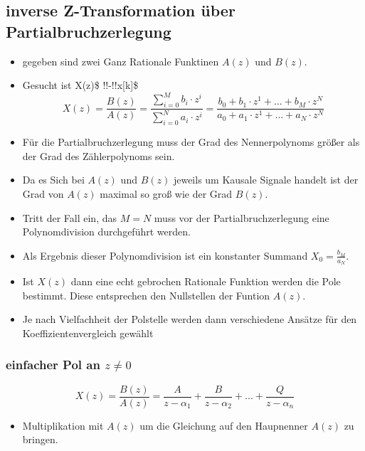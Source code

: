 \documentclass[11pt]{article}
\providecommand{\tightlist}{%
      \setlength{\itemsep}{0pt}\setlength{\parskip}{0pt}}
\begin{document}
    \subsection{inverse Z-Transformation über
Partialbruchzerlegung}\label{inverse-z-transformation-uxfcber-partialbruchzerlegung}

\begin{itemize}
\item
  gegeben sind zwei Ganz Rationale Funktinen \(A(z)\) und \(B(z)\).
\item
  Gesucht ist X(z)\$ \bullet !!-!!\circ x{[}k{]}\$
  \[X(z) = \frac{B(z)}{A(z)} = \frac {\sum_{i=0}^M b_i \cdot z^{i}} {\sum_{i=0}^N a_i \cdot z^{i}} = \frac{b_0 + b_1 \cdot z^1 + ... + b_M \cdot z^N}{a_0 + a_1 \cdot z^1 + ... + a_N \cdot z^N}\]
\item
  Für die Partialbruchzerlegung muss der Grad des Nennerpolynoms größer
  als der Grad des Zählerpolynoms sein.
\item
  Da es Sich bei \(A(z)\) und \(B(z)\) jeweils um Kausale Signale
  handelt ist der Grad von \(A(z)\) maximal so groß wie der Grad
  \(B(z)\).
\item
  Tritt der Fall ein, das \(M = N\) muss vor der Partialbruchzerlegung
  eine Polynomdivision durchgeführt werden.
\item
  Als Ergebnis dieser Polynomdivision ist ein konstanter Summand
  \(X_0 = \frac{b_M}{a_N}\).
\item
  Ist \(X(z)\) dann eine echt gebrochen Rationale Funktion werden die
  Pole bestimmt. Diese entsprechen den Nullstellen der Funtion \(A(z)\).
\item
  Je nach Vielfachheit der Polstelle werden dann verschiedene Ansätze
  für den Koeffizientenvergleich gewählt
\end{itemize}

    \subsubsection{\texorpdfstring{einfacher Pol an
\(z \neq 0\)}{einfacher Pol an z \textbackslash{}neq 0}}\label{einfacher-pol-an-z-neq-0}

\[ X(z) = \frac{B(z)}{A(z)} = \frac{A}{z-\alpha_1} + \frac{B}{z-\alpha_2} + ... + \frac{Q}{z-\alpha_n}\]

\begin{itemize}
\tightlist
\item
  Multiplikation mit \(A(z)\) um die Gleichung auf den Haupnenner
  \(A(z)\) zu bringen.
\end{itemize}
\end{document}
